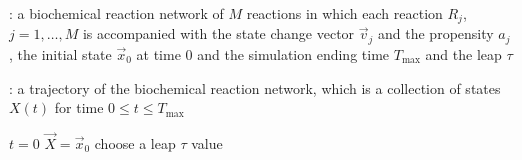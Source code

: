 \begin{algorithm}[H]
\DontPrintSemicolon
{}

\caption{\protect\TitleFunction{}}
\label{algo:implicit-tau-leaping}

\Input: a biochemical reaction network of $M$ reactions in which each reaction $R_j$, $j=1, \dots, M$ is accompanied with the state change vector $\vec{v}_j$ and the propensity $a_j$, the initial state $\vec{x}_0$ at time $0$ and the simulation ending time $T_{\max}$ and the leap $\tau$\;

\Output: a trajectory of the biochemical reaction network, which is a collection of states $X(t)$ for time $0\le t\le T_{\max}$\;

$t = 0$\;
$\vec{X} = \vec{x}_0$\;
choose a leap $\tau$ value\;


\end{algorithm}
